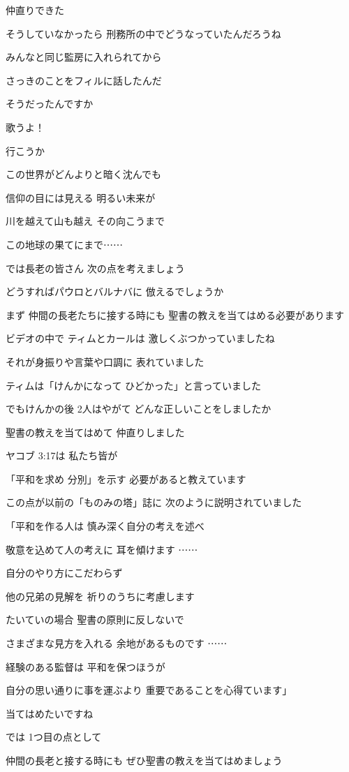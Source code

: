 \documentclass[twocolumn]{jsarticle}
\begin{document}
仲直りできた

そうしていなかったら
刑務所の中でどうなっていたんだろうね

みんなと同じ監房に入れられてから

さっきのことをフィルに話したんだ

そうだったんですか

歌うよ！

行こうか

この世界がどんよりと暗く沈んでも

信仰の目には見える 明るい未来が

川を越えて山も越え その向こうまで

この地球の果てにまで⋯⋯

では長老の皆さん
次の点を考えましょう

どうすればパウロとバルナバに
倣えるでしょうか

まず 仲間の長老たちに接する時にも
聖書の教えを当てはめる必要があります

ビデオの中で ティムとカールは
激しくぶつかっていましたね

それが身振りや言葉や口調に
表れていました

ティムは「けんかになって
ひどかった」と言っていました

でもけんかの後 2人はやがて
どんな正しいことをしましたか

聖書の教えを当てはめて
仲直りしました

ヤコブ 3:17は 私たち皆が

「平和を求め 分別」を示す
必要があると教えています

この点が以前の「ものみの塔」誌に
次のように説明されていました

「平和を作る人は
慎み深く自分の考えを述べ

敬意を込めて人の考えに
耳を傾けます ⋯⋯

自分のやり方にこだわらず

他の兄弟の見解を
祈りのうちに考慮します

たいていの場合
聖書の原則に反しないで

さまざまな見方を入れる
余地があるものです ⋯⋯

経験のある監督は 平和を保つほうが

自分の思い通りに事を運ぶより
重要であることを心得ています」

当てはめたいですね

では 1つ目の点として

仲間の長老と接する時にも
ぜひ聖書の教えを当てはめましょう
\end{document}
